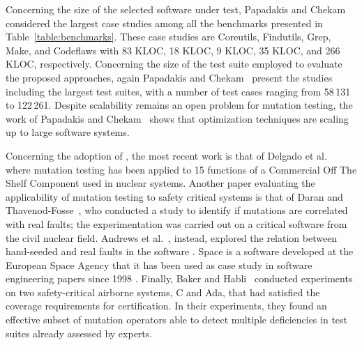 Concerning the size of the selected software under test, Papadakis and Chekam~\cite{papadakis2018mutation,chekam2017empirical,papadakis2018mutant} considered the largest case studies among all the benchmarks presented in Table~\ref{table:benchmarks}. These case studies are Coreutils, Findutils, Grep, Make, and Codeflaws with 83 KLOC, 18 KLOC, 9 KLOC, 35 KLOC, and 266 KLOC, respectively. 
Concerning the size of the test suite employed to evaluate the proposed approaches, again Papadakis and Chekam~\cite{papadakis2018mutation,chekam2017empirical,papadakis2018mutant} present the studies including the largest test suites, with a number of test cases ranging from 58\,131 to 122\,261.
Despite scalability remains an open problem for mutation testing, the work of Papadakis and Chekam~\cite{papadakis2018mutation,chekam2017empirical,papadakis2018mutant} shows that optimization techniques are scaling up to large software systems.

Concerning the adoption of , the most recent work is that of Delgado et al.~\cite{delgado2018evaluation} where mutation testing has been applied to 15 functions of a Commercial Off The Shelf Component used in nuclear systems. 
Another paper evaluating the applicability of mutation testing to safety critical systems is that of Daran and Thavenod-Fosse~\cite{daran1996software}, who conducted a study to identify if mutations are correlated with real faults; the experimentation was carried out on a critical software from the civil nuclear field. 
Andrews et al.~\cite{andrews2005mutation}, instead, explored the relation between hand-seeded and real faults in the software . Space is a software developed at the European Space Agency that it has been used as case study in software engineering papers since 1998 \cite{frankl1998further}.
Finally,  Baker and Habli~\cite{baker2012empirical} conducted experiments on two safety-critical airborne systems, C and Ada, that had satisfied the coverage requirements for certification. In their experiments, they found an effective subset of mutation operators able to detect multiple deficiencies in test suites already assessed by experts. 



